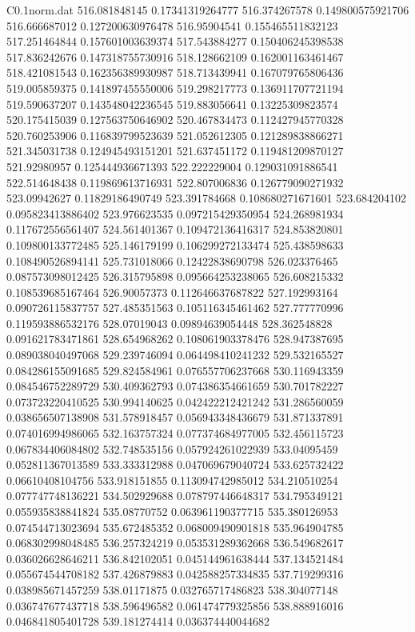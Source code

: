 \begin{filecontents}{C0.1norm.dat}
516.081848145		0.17341319264777
516.374267578		0.149800575921706
516.666687012		0.127200630976478
516.95904541		0.155465511832123
517.251464844		0.157601003639374
517.543884277		0.150406245398538
517.836242676		0.147318755730916
518.128662109		0.162001163461467
518.421081543		0.162356389930987
518.713439941		0.167079765806436
519.005859375		0.141897455550006
519.298217773		0.136911707721194
519.590637207		0.143548042236545
519.883056641		0.13225309823574
520.175415039		0.127563750646902
520.467834473		0.112427945770328
520.760253906		0.116839799523639
521.052612305		0.121289838866271
521.345031738		0.124945493151201
521.637451172		0.119481209870127
521.92980957		0.125444936671393
522.222229004		0.129031091886541
522.514648438		0.119869613716931
522.807006836		0.126779090271932
523.09942627		0.11829186490749
523.391784668		0.108680271671601
523.684204102		0.095823413886402
523.976623535		0.097215429350954
524.268981934		0.117672556561407
524.561401367		0.109472136416317
524.853820801		0.109800133772485
525.146179199		0.106299272133474
525.438598633		0.108490526894141
525.731018066		0.12422838690798
526.023376465		0.087573098012425
526.315795898		0.095664253238065
526.608215332		0.108539685167464
526.90057373		0.112646637687822
527.192993164		0.090726115837757
527.485351563		0.105116345461462
527.777770996		0.119593886532176
528.07019043		0.09894639054448
528.362548828		0.091621783471861
528.654968262		0.108061903378476
528.947387695		0.089038040497068
529.239746094		0.064498410241232
529.532165527		0.084286155091685
529.824584961		0.076557706237668
530.116943359		0.084546752289729
530.409362793		0.074386354661659
530.701782227		0.073723220410525
530.994140625		0.042422212421242
531.286560059		0.038656507138908
531.578918457		0.056943348436679
531.871337891		0.074016994986065
532.163757324		0.077374684977005
532.456115723		0.067834406084802
532.748535156		0.057924261022939
533.04095459		0.052811367013589
533.333312988		0.047069679040724
533.625732422		0.06610408104756
533.918151855		0.113094742985012
534.210510254		0.077747748136221
534.502929688		0.078797446648317
534.795349121		0.055935838841824
535.08770752		0.063961190377715
535.380126953		0.074544713023694
535.672485352		0.068009490901818
535.964904785		0.068302998048485
536.257324219		0.053531289362668
536.549682617		0.036026628646211
536.842102051		0.045144961638444
537.134521484		0.055674544708182
537.426879883		0.042588257334835
537.719299316		0.038985671457259
538.01171875		0.032765717486823
538.304077148		0.036747677437718
538.596496582		0.061474779325856
538.888916016		0.046841805401728
539.181274414		0.036374440044682

\end{filecontents}
